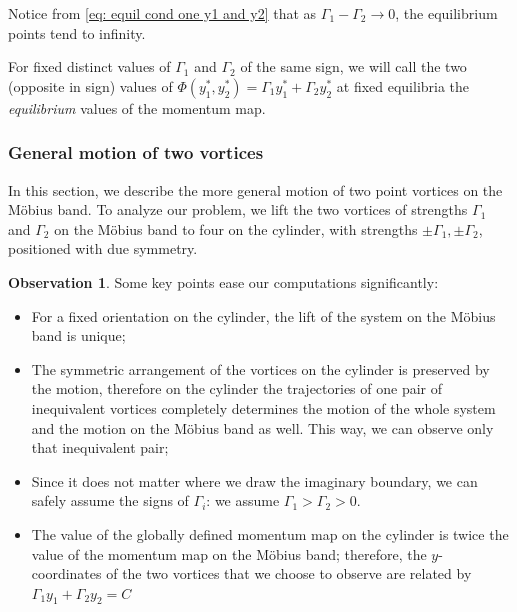 \documentclass[11pt,twoside]{article}
\theoremstyle{definition}
\newtheorem{obs}[theorem]{Observation}
\numberwithin{equation}{section}
\begin{document}
Notice from \eqref{eq: equil cond one y1 and y2} that as $\Gamma_1-\Gamma_2\to0$, the equilibrium points tend to infinity. 

For fixed distinct values of $\Gamma_1$ and $\Gamma_2$ of the same sign, we will call the two (opposite in sign) values of  $\Phi(y^{\ast}_1,y^{\ast}_2)= \Gamma_1y^{\ast}_1 + \Gamma_2y^{\ast}_2$ at fixed equilibria the \textit{equilibrium} values of the momentum map. 





\subsubsection{General motion of two vortices}


In this section, we describe the more general motion of two point vortices on the M\"obius band.  To analyze our problem, we lift the two vortices of strengths $\Gamma_1$ and $\Gamma_2$ on the M\"obius band to four on the cylinder, with strengths $\pm\Gamma_1, \pm\Gamma_2$, positioned with due symmetry.
\begin{obs}
Some key points ease our computations significantly:
\begin{itemize}

\item For a fixed orientation on the cylinder, the lift of the system on the M\"obius band is unique;


   \item The symmetric arrangement of the vortices on the cylinder is preserved by the motion, therefore on the cylinder the trajectories  of one pair of inequivalent vortices  completely determines the motion of the whole system and the motion on the M\"obius band as well. This way, we can observe only that inequivalent pair;
   
 \item Since it does not matter where we draw the imaginary boundary, we can safely assume the signs of $\Gamma_i$:  we  assume $\Gamma_1> \Gamma_2>0$.
    \item The value of the globally defined momentum map on the cylinder is twice the value of the momentum map on the M\"obius band; therefore, the $y$-coordinates of the two vortices that we choose to observe are related by
    $\Gamma_1y_1 + \Gamma_2y_2 = C$
   
\end{itemize}
\end{obs}
\end{document}
